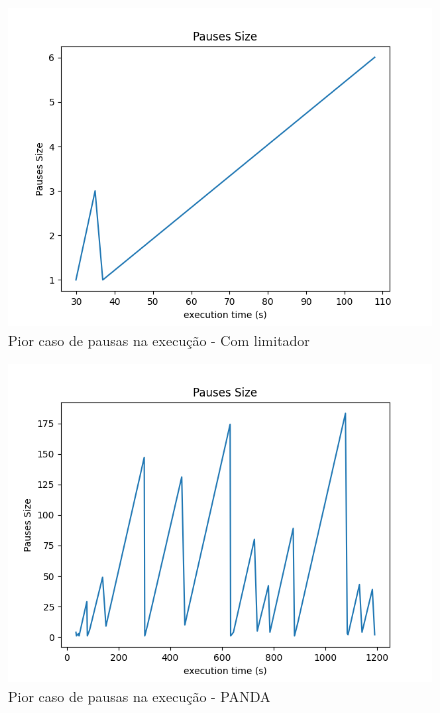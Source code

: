 \documentclass[10pt,twocolumn,letterpaper]{article}
\begin{document}
	\begin{figure}
		\centering
		\includegraphics[width=\linewidth]{playback_pauses.png}
		\caption{Pior caso de pausas na execução - Com limitador}
		\label{fig:5}
	\end{figure}
	\begin{figure}
		\centering
		\includegraphics[width=\linewidth]{playback_pauses_25.png}
		\caption{Pior caso de pausas na execução - PANDA}
		\label{fig:6}
	\end{figure}
\end{document}
